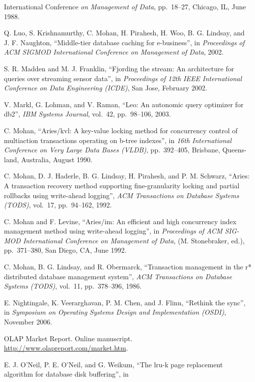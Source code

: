 \documentclass[a4paper,11pt,twoside,openright]{book}
\begin{document}
\begin{enumerate}[label={[\arabic*]}]
{  International Conference} \emph{on Management of Data}, pp.~18--27,
  Chicago, IL, June 1988.
\item
  Q. Luo, S. Krishnamurthy, C. Mohan, H. Pirahesh, H. Woo, B. G.
  Lindsay, and J. F. Naughton, ``Middle-tier database caching for
  e-business'', in \emph{Proceedings} \emph{of ACM SIGMOD International
  Conference on Management of Data}, 2002.
\item
  S. R. Madden and M. J. Franklin, ``Fjording the stream: An
  architecture for queries over streaming sensor data'', in
  \emph{Proceedings of 12th IEEE International} \emph{Conference on Data
  Engineering (ICDE)}, San Jose, February 2002.
\item
  V. Markl, G. Lohman, and V. Raman, ``Leo: An autonomic query optimizer
  for db2'', \emph{IBM Systems Journal}, vol.~42, pp.~98--106, 2003.
\item
  C. Mohan, ``Aries/kvl: A key-value locking method for concurrency
  control of multiaction transactions operating on b-tree indexes'', in
  \emph{16th International} \emph{Conference on Very Large Data Bases
  (VLDB)}, pp.~392--405, Brisbane, Queens-land, Australia, August 1990.
\item
  C. Mohan, D. J. Haderle, B. G. Lindsay, H. Pirahesh, and P. M.
  Schwarz, ``Aries: A transaction recovery method supporting
  fine-granularity locking and partial rollbacks using write-ahead
  logging'', \emph{ACM Transactions on Database} \emph{Systems (TODS)},
  vol.~17, pp.~94--162, 1992.
\item
  C. Mohan and F. Levine, ``Aries/im: An efficient and high concurrency
  index management method using write-ahead logging'', in
  \emph{Proceedings of ACM SIG-MOD International Conference on
  Management of Data}, (M. Stonebraker, ed.), pp.~371--380, San Diego,
  CA, June 1992.
\item
  C. Mohan, B. G. Lindsay, and R. Obermarck, ``Transaction management in
  the r* distributed database management system'', \emph{ACM
  Transactions on Database} \emph{Systems (TODS)}, vol.~11,
  pp.~378--396, 1986.
\item
  E. Nightingale, K. Veerarghavan, P. M. Chen, and J. Flinn, ``Rethink
  the sync'', in \emph{Symposium on Operating Systems Design and
  Implementation (OSDI)}, November 2006.
\item
  OLAP Market Report. Online manuscript.
  \url{http://www.olapreport.com/market.htm}.
\item
  E. J. O'Neil, P. E. O'Neil, and G. Weikum, ``The lru-k page
  replacement algorithm for database disk buffering'', in

\end{enumerate}
\end{document}
